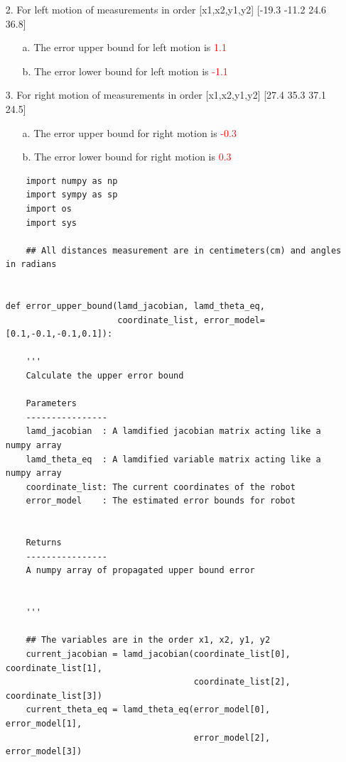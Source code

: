 {\begin{itemize}
        \item[2.] For left motion of measurements in order [x1,x2,y1,y2] [-19.3 -11.2  24.6  36.8]
        
        \begin{itemize}
            \item[a.] The error upper bound for left motion is \textcolor{red}{1.1 \textdegree} 
            \item[b.] The error lower bound for left motion is \textcolor{red}{-1.1 \textdegree }
        \end{itemize}

        \item[3.] For right motion of measurements in order [x1,x2,y1,y2] [27.4 35.3 37.1 24.5]
        
        \begin{itemize}
            \item[a.] The error upper bound for right motion is \textcolor{red}{-0.3 \textdegree }
            \item[b.] The error lower bound for right motion is \textcolor{red}{0.3 \textdegree }
        \end{itemize}


            
        \begin{verbatim}
    import numpy as np
    import sympy as sp
    import os
    import sys
    
    ## All distances measurement are in centimeters(cm) and angles in radians 


def error_upper_bound(lamd_jacobian, lamd_theta_eq, 
                      coordinate_list, error_model=[0.1,-0.1,-0.1,0.1]):
    
    '''
    Calculate the upper error bound
    
    Parameters
    ----------------
    lamd_jacobian  : A lamdified jacobian matrix acting like a numpy array
    lamd_theta_eq  : A lamdified variable matrix acting like a numpy array
    coordinate_list: The current coordinates of the robot
    error_model    : The estimated error bounds for robot
    
    
    Returns
    ----------------
    A numpy array of propagated upper bound error
    
    
    '''
    
    ## The variables are in the order x1, x2, y1, y2
    current_jacobian = lamd_jacobian(coordinate_list[0], coordinate_list[1],
                                     coordinate_list[2], coordinate_list[3])
    current_theta_eq = lamd_theta_eq(error_model[0], error_model[1], 
                                     error_model[2], error_model[3])
    

\end{verbatim}
\end{itemize}}
